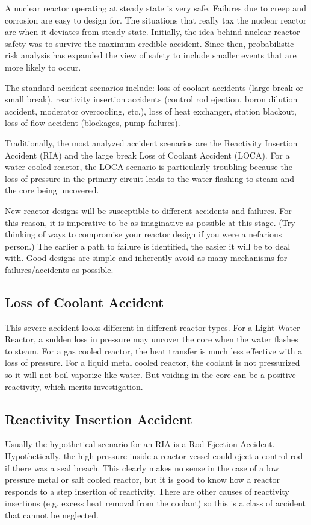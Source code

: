A nuclear reactor operating at steady state is very safe. Failures due to creep and corrosion are easy to design for.
The situations that really tax the nuclear reactor are when it deviates from steady state.
Initially, the idea behind nuclear reactor safety was to survive the maximum credible accident.
Since then, probabilistic risk analysis has expanded the view of safety to include smaller events that are more likely to occur. %

The standard accident scenarios include: loss of coolant accidents (large break or small break), reactivity insertion accidents (control rod ejection, boron dilution accident, moderator overcooling, etc.), loss of heat exchanger, station blackout, loss of flow accident (blockages, pump failures).

Traditionally, the most analyzed accident scenarios are the Reactivity Insertion Accident (RIA) and the large break Loss of Coolant Accident (LOCA). 
For a water-cooled reactor, the LOCA scenario is particularly troubling because the loss of pressure in the primary circuit leads to the water flashing to steam and the core being uncovered.

New reactor designs will be susceptible to different accidents and failures. For this reason, it is imperative to be as imaginative as possible at this stage.
(Try thinking of ways to compromise your reactor design if you were a nefarious person.)
The earlier a path to failure is identified, the easier it will be to deal with.
Good designs are simple and inherently avoid as many mechanisms for failures/accidents as possible.

\subsection{Loss of Coolant Accident}
This severe accident looks different in different reactor types. For a Light Water Reactor, a sudden loss in pressure may uncover the core when the water flashes to steam.
For a gas cooled reactor, the heat transfer is much less effective with a loss of pressure.
For a liquid metal cooled reactor, the coolant is not pressurized so it will not boil vaporize like water. But voiding in the core can be a positive reactivity, which merits investigation.

\subsection{Reactivity Insertion Accident}
Usually the hypothetical scenario for an RIA is a Rod Ejection Accident. Hypothetically, the high pressure inside a reactor vessel could eject a control rod if there was a seal breach.
This clearly makes no sense in the case of a low pressure metal or salt cooled reactor, but it is good to know how a reactor responds to a step insertion of reactivity.
There are other causes of reactivity insertions (e.g. excess heat removal from the coolant) so this is a class of accident that cannot be neglected.


